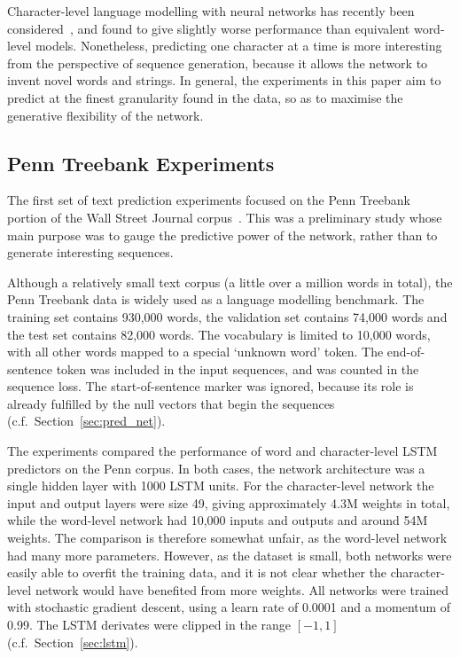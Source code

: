 \documentclass{article}
\newcommand{\cf}{c.f.\ }
\newcommand{\sref}[1]{Section~\ref{sec:#1}}
\begin{document}
Character-level language modelling with neural networks has recently been considered~\cite{sutskever11rnn,mikolov12subword}, and found to give slightly worse performance than equivalent word-level models.
Nonetheless, predicting one character at a time is more interesting from the perspective of sequence generation, because it allows the network to invent novel words and strings.
In general, the experiments in this paper aim to predict at the finest granularity found in the data, so as to maximise the generative flexibility of the network.



\subsection{Penn Treebank Experiments}
The first set of text prediction experiments focused on the Penn Treebank portion of the Wall Street Journal corpus~\cite{penn}.
This was a preliminary study whose main purpose was to gauge the predictive power of the network, rather than to generate interesting sequences.

Although a relatively small text corpus (a little over a million words in total), the Penn Treebank data is widely used as a language modelling benchmark.
The training set contains 930,000 words, the validation set contains 74,000 words and the test set  contains 82,000 words.
The vocabulary is limited to 10,000 words, with all other words mapped to a special `unknown word' token.
The end-of-sentence token was included in the input sequences, and was counted in the sequence loss.
The start-of-sentence marker was ignored, because its role is already fulfilled by the null vectors that begin the sequences (\cf \sref{pred_net}).

The experiments compared the performance of word and character-level LSTM predictors on the Penn corpus.
In both cases, the network architecture was a single hidden layer with 1000 LSTM units.
For the character-level network the input and output layers were size 49, giving approximately 4.3M weights in total, while the word-level network had 10,000 inputs and outputs and around 54M weights.
The comparison is therefore somewhat unfair, as the word-level network had many more parameters.
However, as the dataset is small, both networks were easily able to overfit the training data, and it is not clear whether the character-level network would have benefited from more weights.
All networks were trained with stochastic gradient descent, using a learn rate of 0.0001 and a momentum of 0.99.
The LSTM derivates were clipped in the range $[-1,1]$ (\cf \sref{lstm}).
\end{document}
